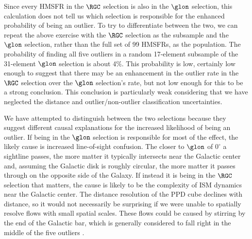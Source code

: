 Since every HMSFR in the $\RGC$ selection is also in the $\glon$ selection, this calculation does not tell us which selection is responsible for the enhanced probability of being an outlier.
To try to differentiate between the two, we can repeat the above exercise with the $\RGC$ selection as the subsample and the $\glon$ selection, rather than the full set of 99 HMSFRs, as the population. 
The probability of finding all five outliers in a random 17-element subsample of the 31-element $\glon$ selection is about 4\%. 
This probability is low, certainly low enough to suggest that there may be an enhancement in the outlier rate in the $\RGC$ selection over the $\glon$ selection's rate, but not low enough for this to be a strong conclusion.
This conclusion is particularly weak considering that we have neglected the distance and outlier/non-outlier classification uncertainties.

We have attempted to distinguish between the two selections because they suggest different causal explanations for the increased likelihood of being an outlier. 
If being in the $\glon$ selection is responsible for most of the effect, the likely cause is increased line-of-sight confusion. 
The closer to $\glon$ of $0^\circ$ a sightline passes, the more matter it typically intersects near the Galactic center and, assuming the Galactic disk is roughly circular, the more matter it passes through on the opposite side of the Galaxy. 
If instead it is being in the $\RGC$ selection that matters, the cause is likely to be the complexity of ISM dynamics near the Galactic center.
The distance resolution of the PPD cube declines with distance, so it would not necessarily be surprising if we were unable to spatially resolve flows with small spatial scales.
These flows could be caused by stirring by the end of the Galactic bar, which is generally considered to fall right in the middle of the five outliers \cite{2016arXiv160207702B}.
